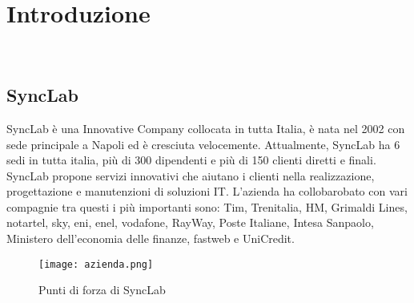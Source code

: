 
\chapter{Introduzione}
\label{cap:introduzione}




\\
\section{SyncLab }
SyncLab è una Innovative Company collocata in tutta Italia, è nata nel 2002 con sede principale a Napoli ed è cresciuta velocemente. Attualmente, SyncLab ha 6 sedi in tutta italia, più di 300 dipendenti e più di 150 clienti diretti e finali.\\
SyncLab propone servizi innovativi che aiutano i clienti nella realizzazione, progettazione e manutenzioni di soluzioni IT.
L'azienda ha collobarobato con vari compagnie tra questi i più importanti sono: Tim, Trenitalia, HM, Grimaldi Lines, notartel, sky, eni, enel, vodafone, RayWay, Poste Italiane, Intesa Sanpaolo, Ministero dell'economia delle finanze, fastweb e UniCredit.
\begin{figure}[H]
    \centering
    \texttt{[image: azienda.png]}
    \caption{Punti di forza di SyncLab}
\end{figure}
